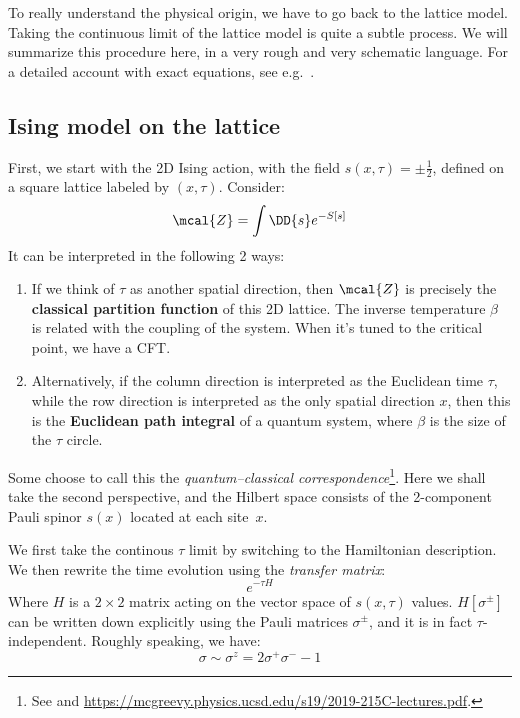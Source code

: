 \documentclass[a4paper
	,10pt
]{article}
\begin{document}
	To really understand the physical origin, we have to go back to the lattice model. Taking the continuous limit of the lattice model is quite a subtle process. We will summarize this procedure here, in a very rough and very schematic language. For a detailed account with exact equations, see e.g.~\cite{Atanasov:2017abc,Kogut:1979wt,Fradkin:1991nr}. 
\subsection{Ising model on the lattice}
	First, we start with the 2D Ising action, with the field $s(x,\tau) = \pm\frac{1}{2}$, defined on a square lattice labeled by $(x,\tau)$. Consider:
	\begin{equation}
		\mcal{Z} = \int \DD{s} e^{-S[s]}
	\end{equation}
	It can be interpreted in the following 2 ways:
	\begin{enumerate}
	\item If we think of $\tau$ as another spatial direction, then $\mcal{Z}$ is precisely the \textbf{classical partition function} of this 2D lattice. The inverse temperature $\beta$ is related with the coupling of the system. When it's tuned to the critical point, we have a CFT. 
	
	\item Alternatively, if the column direction is interpreted as the Euclidean time $\tau$, while the row direction is interpreted as the only spatial direction $x$, then this is the \textbf{Euclidean path integral} of a quantum system, where $\beta$ is the size of the $\tau$ circle. 
	\end{enumerate}
	
	Some choose to call this the \textit{quantum--classical correspondence}\footnote{
		See \cite{Simmons-Duffin:2016gjk} and \url{https://mcgreevy.physics.ucsd.edu/s19/2019-215C-lectures.pdf}. 
	}. Here we shall take the second perspective, and the Hilbert space consists of the 2-component Pauli spinor $s(x)$ located at each site~$x$. 
	
	We first take the continous $\tau$ limit by switching to the Hamiltonian description. We then rewrite the time evolution using the \textit{transfer matrix}:
	\begin{equation}
		e^{-\tau H}
	\end{equation}
	Where $H$ is a $2\times 2$ matrix acting on the vector space of $s(x,\tau)$ values. 
	$H[\sigma^\pm]$ can be written down explicitly using the Pauli matrices $\sigma^\pm$, and it is in fact $\tau$-independent. Roughly speaking, we have:
	\begin{equation}
		\sigma \sim \sigma^z
		= 2\sigma^+ \sigma^- - 1
	\end{equation}
	
\end{document}

